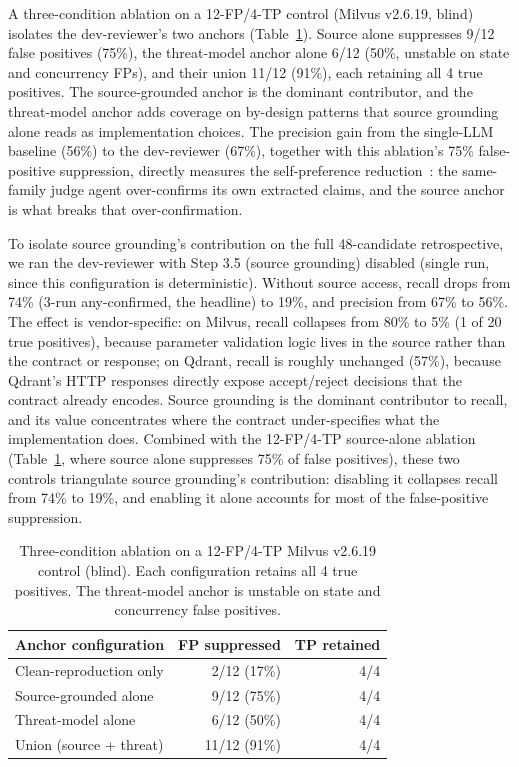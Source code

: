 \documentclass[sigconf]{acmart}
\begin{document}
A three-condition ablation on a 12-FP/4-TP control (Milvus v2.6.19, blind) isolates the dev-reviewer's two anchors (Table~\ref{tab:ablation}). Source alone suppresses 9/12 false positives (75\%), the threat-model anchor alone 6/12 (50\%, unstable on state and concurrency FPs), and their union 11/12 (91\%), each retaining all 4 true positives. The source-grounded anchor is the dominant contributor, and the threat-model anchor adds coverage on by-design patterns that source grounding alone reads as implementation choices. The precision gain from the single-LLM baseline (56\%) to the dev-reviewer (67\%), together with this ablation's 75\% false-positive suppression, directly measures the self-preference reduction~\cite{panickssery24,wataoka24}: the same-family judge agent over-confirms its own extracted claims, and the source anchor is what breaks that over-confirmation.

To isolate source grounding's contribution on the full 48-candidate retrospective, we ran the dev-reviewer with Step 3.5 (source grounding) disabled (single run, since this configuration is deterministic). Without source access, recall drops from 74\% (3-run any-confirmed, the headline) to 19\%, and precision from 67\% to 56\%. The effect is vendor-specific: on Milvus, recall collapses from 80\% to 5\% (1 of 20 true positives), because parameter validation logic lives in the source rather than the contract or response; on Qdrant, recall is roughly unchanged (57\%), because Qdrant's HTTP responses directly expose accept/reject decisions that the contract already encodes. Source grounding is the dominant contributor to recall, and its value concentrates where the contract under-specifies what the implementation does. Combined with the 12-FP/4-TP source-alone ablation (Table~\ref{tab:ablation}, where source alone suppresses 75\% of false positives), these two controls triangulate source grounding's contribution: disabling it collapses recall from 74\% to 19\%, and enabling it alone accounts for most of the false-positive suppression.

\begin{table}[t]
\caption{Three-condition ablation on a 12-FP/4-TP Milvus v2.6.19 control (blind). Each configuration retains all 4 true positives. The threat-model anchor is unstable on state and concurrency false positives.}
\label{tab:ablation}
\small
\begin{tabular}{@{}lrr@{}}
\toprule
Anchor configuration & FP suppressed & TP retained \\
\midrule
Clean-reproduction only & 2/12 (17\%) & 4/4 \\
Source-grounded alone & 9/12 (75\%) & 4/4 \\
Threat-model alone & 6/12 (50\%) & 4/4 \\
Union (source + threat) & 11/12 (91\%) & 4/4 \\
\bottomrule
\end{tabular}
\end{table}
\end{document}
